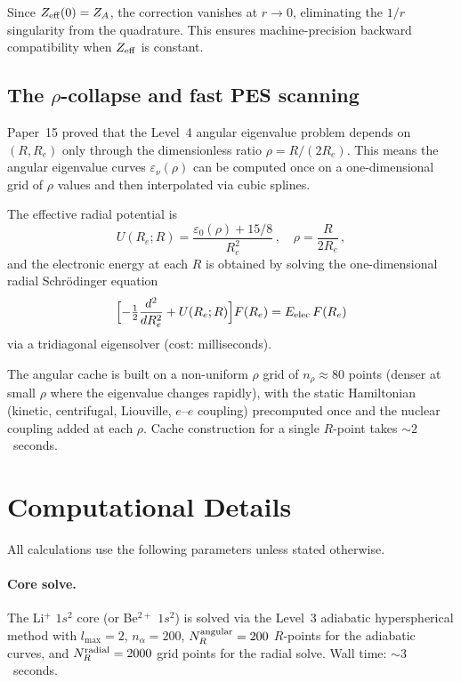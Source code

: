 \documentclass[aps,pra,twocolumn,superscriptaddress,longbibliography,floatfix]{revtex4-2}
\begin{document}
Since $Z_{\rm eff}(0) = Z_A$, the correction vanishes at $r \to 0$,
eliminating the $1/r$ singularity from the quadrature.  This ensures
machine-precision backward compatibility when $Z_{\rm eff}$ is
constant.


\subsection{The \texorpdfstring{$\rho$}{rho}-collapse and fast PES
scanning}
\label{sec:rho_collapse}

Paper~15 proved that the Level~4 angular eigenvalue problem depends
on $(R, R_e)$ only through the dimensionless ratio
$\rho = R/(2R_e)$.  This means the angular eigenvalue curves
$\varepsilon_\nu(\rho)$ can be computed once on a one-dimensional grid
of $\rho$ values and then interpolated via cubic splines.

The effective radial potential is
\begin{equation}
  U(R_e; R) = \frac{\varepsilon_0(\rho) + 15/8}{R_e^2}\,,
  \quad \rho = \frac{R}{2R_e}\,,
  \label{eq:U_eff}
\end{equation}
and the electronic energy at each $R$ is obtained by solving the
one-dimensional radial Schr\"odinger equation
\begin{equation}
  \Bigl[-\tfrac{1}{2}\frac{d^2}{dR_e^2} + U(R_e; R)\Bigr]
    F(R_e) = E_{\rm elec}\,F(R_e)
  \label{eq:radial}
\end{equation}
via a tridiagonal eigensolver (cost: milliseconds).

The angular cache is built on a non-uniform $\rho$ grid of
$n_\rho \approx 80$ points (denser at small $\rho$ where the
eigenvalue changes rapidly), with the static Hamiltonian (kinetic,
centrifugal, Liouville, $e$--$e$ coupling) precomputed once and the
nuclear coupling added at each $\rho$.  Cache construction for a
single $R$-point takes ${\sim}2$~seconds.


\section{Computational Details}
\label{sec:details}

All calculations use the following parameters unless stated otherwise.

\paragraph{Core solve.}
The Li$^+$ $1s^2$ core (or Be$^{2+}$ $1s^2$) is solved via the
Level~3 adiabatic hyperspherical method with
$l_{\max} = 2$, $n_\alpha = 200$, $N_{R}^{\rm angular} = 200$
$R$-points for the adiabatic curves, and
$N_{R}^{\rm radial} = 2000$ grid points for the radial solve.
Wall time: ${\sim}3$~seconds.
\end{document}
